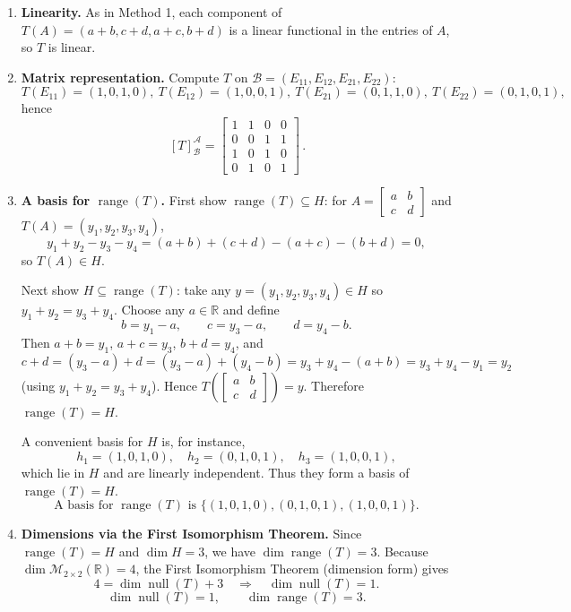 \documentclass[12pt]{article}
\begin{document}
\begin{enumerate}[label=(\alph*)]
\item \textbf{Linearity.}
As in Method 1, each component of $T(A)=(a+b,c+d,a+c,b+d)$ is a linear functional in the entries of $A$, so $T$ is linear.

\item \textbf{Matrix representation.}
Compute $T$ on $\mathcal{B}=(E_{11},E_{12},E_{21},E_{22})$:
\[
T(E_{11})=(1,0,1,0),\ 
T(E_{12})=(1,0,0,1),\ 
T(E_{21})=(0,1,1,0),\ 
T(E_{22})=(0,1,0,1),
\]
hence
\[
\boxed{\, [T]_{\mathcal{B}}^{\mathcal{A}}=
\begin{bmatrix}
1&1&0&0\\
0&0&1&1\\
1&0&1&0\\
0&1&0&1
\end{bmatrix}\,}.
\]

\item \textbf{A basis for $\operatorname{range}(T)$.}
First show $\operatorname{range}(T)\subseteq H$:
for $A=\begin{bmatrix}a&b\\c&d\end{bmatrix}$ and $T(A)=(y_1,y_2,y_3,y_4)$,
\[
y_1+y_2-y_3-y_4=(a+b)+(c+d)-(a+c)-(b+d)=0,
\]
so $T(A)\in H$.

Next show $H\subseteq \operatorname{range}(T)$:
take any $y=(y_1,y_2,y_3,y_4)\in H$ so $y_1+y_2=y_3+y_4$.
Choose any $a\in\mathbb{R}$ and define
\[
b=y_1-a,\qquad c=y_3-a,\qquad d=y_4-b.
\]
Then $a+b=y_1$, $a+c=y_3$, $b+d=y_4$, and
\[
c+d=(y_3-a)+d=(y_3-a)+(y_4-b)=y_3+y_4-(a+b)=y_3+y_4-y_1=y_2
\]
(using $y_1+y_2=y_3+y_4$). Hence $T\!\left(\begin{bmatrix}a&b\\c&d\end{bmatrix}\right)=y$.
Therefore $\operatorname{range}(T)=H$.

A convenient basis for $H$ is, for instance,
\[
h_1=(1,0,1,0),\quad h_2=(0,1,0,1),\quad h_3=(1,0,0,1),
\]
which lie in $H$ and are linearly independent. Thus they form a basis of $\operatorname{range}(T)=H$.
\[
\boxed{\,\text{A basis for }\operatorname{range}(T)\text{ is }\{(1,0,1,0),(0,1,0,1),(1,0,0,1)\}.\,}
\]

\item \textbf{Dimensions via the First Isomorphism Theorem.}
Since $\operatorname{range}(T)=H$ and $\dim H=3$, we have $\dim\operatorname{range}(T)=3$.
Because $\dim\mathcal{M}_{2\times 2}(\mathbb{R})=4$, the First Isomorphism Theorem (dimension form) gives
\[
4=\dim\operatorname{null}(T)+3 \quad\Rightarrow\quad \dim\operatorname{null}(T)=1.
\]
\[
\boxed{\,\dim\operatorname{null}(T)=1,\qquad \dim\operatorname{range}(T)=3.\,}
\]


\end{enumerate}
\end{document}
